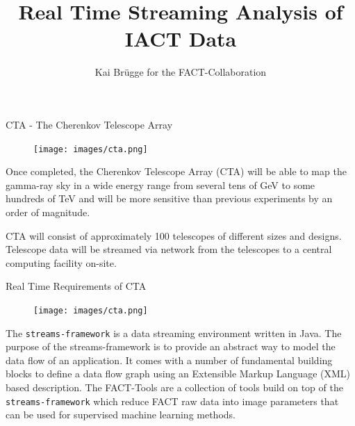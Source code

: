 

\title{Real Time Streaming Analysis of IACT Data}
\author{Kai Brügge \large{for the FACT-Collaboration}}
\usetikzlibrary{calc}
\usetikzlibrary{shadows.blur}

%


\begin{multicols}{2}
    \begin{block}[equal height group=B]{CTA - The Cherenkov Telescope Array}%
      \begin{multicols}{2}
        \begin{figure}
          \texttt{[image: images/cta.png]}\\
        \end{figure}
        \columnbreak
        Once completed, the  Cherenkov Telescope Array (CTA)  will be able to map the gamma-ray sky
        in a wide energy range from several tens of GeV to some hundreds of TeV and will be more sensitive
        than previous experiments by an order of magnitude.

        CTA will consist of approximately 100 telescopes of different sizes and designs.
        Telescope data will be streamed via network from the telescopes to a central computing facility
        on-site.
      \end{multicols}
    \end{block}%

    \begin{block}[equal height group=B]{Real Time Requirements of CTA}%
      \begin{multicols}{2}
        \begin{figure}
          \texttt{[image: images/cta.png]}\\
        \end{figure}
        \columnbreak
          The \texttt{streams-framework} is a data streaming environment written in Java.
          The purpose of the streams-framework is to provide an abstract way to model the data flow of an application.
          It comes with a number of fundamental building blocks to define a data flow graph using an Extensible Markup Language (XML) based description.
          The FACT-Tools are a collection of tools build on top of the \texttt{streams-framework} which reduce FACT raw data into image parameters that
          can be used for supervised machine learning methods.
      \end{multicols}
    \end{block}%



\end{multicols}
